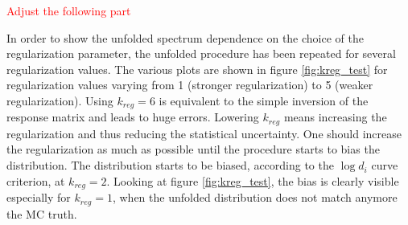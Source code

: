 \textcolor{red}{Adjust the following part}




In order to show the unfolded spectrum dependence on the choice of the regularization parameter, the unfolded procedure has been repeated for several regularization values. The various plots are shown in figure \ref{fig:kreg_test} for regularization values varying from 1 (stronger regularization) to 5 (weaker regularization). Using $k_{reg} = 6$ is equivalent to the simple inversion of the response matrix and leads to huge errors. Lowering $k_{reg}$ means increasing the regularization and thus reducing the statistical uncertainty. One should increase the regularization as much as possible until the procedure starts to bias the distribution. The distribution starts to be biased, according to the $\log{d_i}$ curve criterion, at $k_{reg} = 2$. Looking at figure \ref{fig:kreg_test}, the bias is clearly visible especially for $k_{reg} = 1$, when the unfolded distribution does not match anymore the MC truth.

